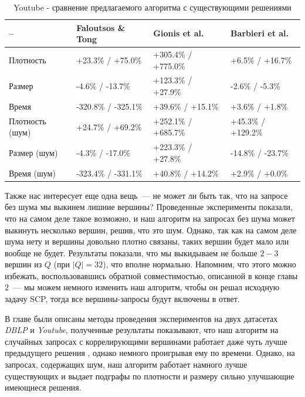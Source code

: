 \begin{table}[!h]
\centering
\caption{Youtube - сравнение предлагаемого алгоритма с существующими решениями}\label{results-youtube}
  \begin{tabular}{| l | l | l | p{3.8cm} |}
  \hline
  -- & Faloutsos \& Tong & Gionis et al. & Barbieri et al. \\\hline
  Плотность       & +23.3\%  / +75.0\%  & +305.4\% / +775.0\% & +6.5\%  / +16.7\%  \\\hline
  Размер          & -4.6\%   / -13.7\%  & +123.3\% / +27.9\%  & -2.6\%  / -5.3\%   \\\hline
  Время           & -320.8\% / -325.1\% & +39.6\%  / +15.1\%  & +3.6\%  / +1.8\%   \\\hline
  Плотность (шум) & +24.7\%  / +69.2\%  & +252.1\% / +685.7\% & +45.3\% / +129.2\% \\\hline
  Размер (шум)    & -4.3\%   / -17.0\%  & +223.3\% / +27.8\%  & -14.8\% / -23.7\%  \\\hline
  Время (шум)     & -323.4\% / -331.1\% & +40.8\%  / +14.2\%  & +2.9\%  / +0.0\%   \\\hline
  \end{tabular}
\end{table}
\FloatBarrier

Также нас интересует еще одна вещь~--- не может ли быть так, что на запросе без шума мы выкинем лишние вершины? Проведенные эксперименты показали, что на самом деле такое возможно, и наш алгоритм на запросах без шума может выкинуть несколько вершин, решив, что это шум. Однако, так как на самом деле шума нету и вершины довольно плотно связаны, таких вершин будет мало или вообще не будет. Результаты показали, что мы выкидываем не больше $2-3$ вершин из $Q$ (при $|Q| = 32$), что вполне нормально. Напомним, что этого можно избежать, воспользовавшись обратной совместимостью, описанной в конце главы $2$~--- мы можем немного изменить наш алгоритм, чтобы он решал исходную задачу SCP, тогда все вершины-запросы будут включены в ответ.

\chapterconclusion

В главе были описаны методы проведения экспериментов на двух датасетах \textit{DBLP} и \textit{Youtube}, полученные результаты показывают, что наш алгоритм на случайных запросах с коррелирующими вершинами работает даже чуть лучше предыдущего решения \cite{Barbieri15}, однако немного проигрывая ему по времени. Однако, на запросах, содержащих шум, наш алгоритм работает намного лучше существующих и выдает подграфы по плотности и размеру сильно улучшающие имеющиеся решения.

